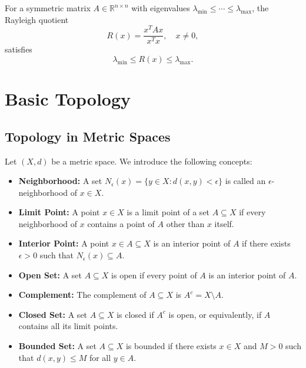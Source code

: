 \begin{theorem}
For a symmetric matrix $A \in \mathbb{R}^{n \times n}$ with eigenvalues $\lambda_{\min} \leq \cdots \leq \lambda_{\max}$,  
the Rayleigh quotient
\[
R(x) = \frac{x^T A x}{x^T x}, \quad x \neq 0,
\]
satisfies
\[
\lambda_{\min} \leq R(x) \leq \lambda_{\max}.
\]
\end{theorem}

\section{Basic Topology}

\subsection{Topology in Metric Spaces}

Let $(X,d)$ be a metric space. We introduce the following concepts:

\begin{itemize}
    \item \textbf{Neighborhood:} A set $N_\epsilon(x) = \{y \in X : d(x,y) < \epsilon\}$ is called an $\epsilon$-neighborhood of $x \in X$.

    \item \textbf{Limit Point:} A point $x \in X$ is a limit point of a set $A \subseteq X$ if every neighborhood of $x$ contains a point of $A$ other than $x$ itself.

    \item \textbf{Interior Point:} A point $x \in A \subseteq X$ is an interior point of $A$ if there exists $\epsilon > 0$ such that $N_\epsilon(x) \subseteq A$.

    \item \textbf{Open Set:} A set $A \subseteq X$ is open if every point of $A$ is an interior point of $A$.

    \item \textbf{Complement:} The complement of $A \subseteq X$ is $A^c = X \setminus A$.

    \item \textbf{Closed Set:} A set $A \subseteq X$ is closed if $A^c$ is open, or equivalently, if $A$ contains all its limit points.

    \item \textbf{Bounded Set:} A set $A \subseteq X$ is bounded if there exists $x \in X$ and $M > 0$ such that $d(x,y) \leq M$ for all $y \in A$.
\end{itemize}


